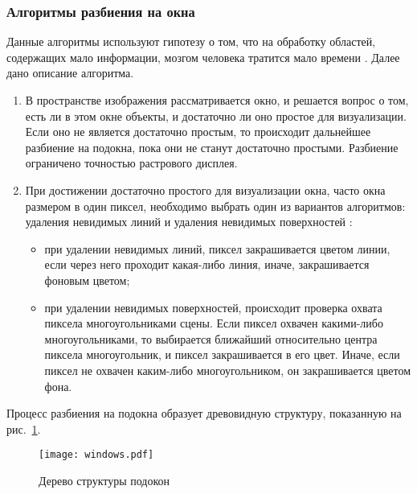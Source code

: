 \subsubsection{Алгоритмы разбиения на окна}

Данные алгоритмы используют гипотезу о том, что на обработку областей, содержащих мало информации, мозгом человека тратится мало времени \cite{bib:8}. Далее дано описание алгоритма.

\begin{enumerate}
\item В пространстве изображения рассматривается окно, и решается вопрос о том, есть ли в этом окне объекты, и достаточно ли оно простое для визуализации. Если оно не является достаточно простым, то происходит дальнейшее разбиение на подокна, пока они не станут достаточно простыми. Разбиение ограничено точностью растрового дисплея.

 \item При достижении достаточно простого для визуализации окна, часто окна размером в один пиксел, необходимо выбрать один из вариантов алгоритмов: удаления невидимых линий и удаления невидимых поверхностей \cite{bib:8}:
 
 \begin{itemize}
 
 \item при удалении невидимых линий, пиксел закрашивается цветом линии, если через него проходит какая-либо линия, иначе, закрашивается фоновым цветом;
 
 \item при удалении невидимых поверхностей, происходит проверка охвата пиксела многоугольниками сцены. Если пиксел охвачен какими-либо многоугольниками, то выбирается ближайший относительно центра пиксела многоугольник, и пиксел закрашивается в его цвет. Иначе, если пиксел не охвачен каким-либо многоугольником, он закрашивается цветом фона.

 \end{itemize}
 
 \end{enumerate}
 
 Процесс разбиения на подокна образует древовидную структуру, показанную на рис.~\ref{img:windows}.
 
\noindent
\begin{figure}[h!]
	\centering
    \texttt{[image: windows.pdf]}
    \caption{Дерево структуры подокон}
    \label{img:windows}
\end{figure}

